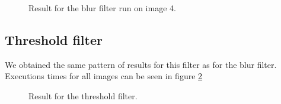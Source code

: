 \documentclass[titlepage, a4paper]{article}
\begin{document}
\begin{figure}[H]
  \centering
  \caption{Result for the blur filter run on image 4.}
  \label{fig:im4-blur}
\end{figure}


\subsection{Threshold filter}
We obtained the same pattern of results for this filter as for the blur filter. Executions times for all images can be seen in figure \ref{fig:threshold}

\begin{figure}[H]
  \centering
  \caption{Result for the threshold filter.}
  \label{fig:threshold}
\end{figure}
\end{document}
